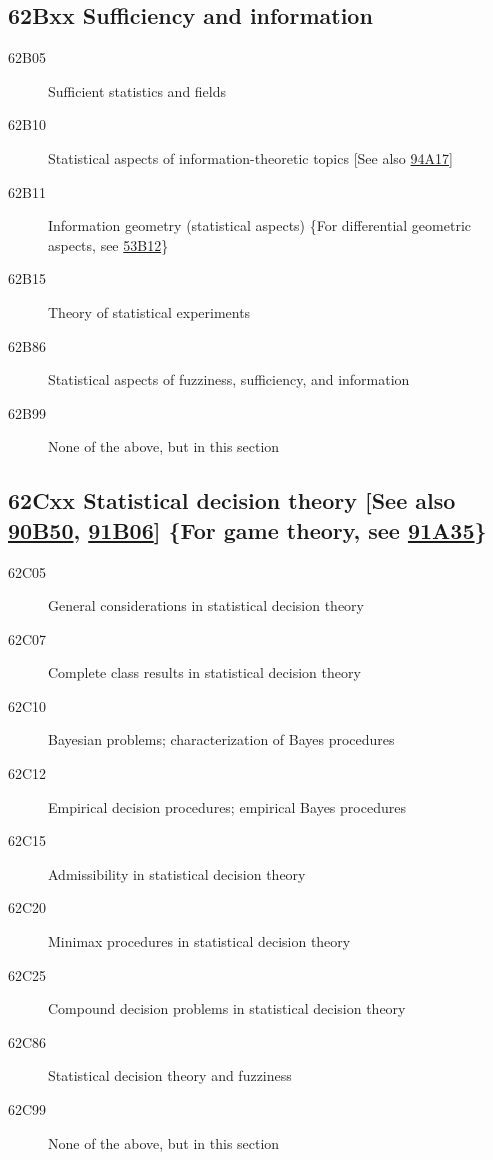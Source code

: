 \subsection*{62Bxx  Sufficiency and information }\label{62Bxx}
\begin{description}  
\item [62B05]\label{62B05} Sufficient statistics and fields
\item [62B10]\label{62B10} Statistical aspects of information-theoretic topics  [See also \hyperref[94A17]{94A17}]
\item [62B11]\label{62B11} Information geometry (statistical aspects) \{For differential geometric aspects, see \hyperref[53B12]{53B12}\}
\item [62B15]\label{62B15} Theory of statistical experiments
\item [62B86]\label{62B86} Statistical aspects of fuzziness, sufficiency, and information
\item [62B99]\label{62B99} None of the above, but in this section
\end{description}
\subsection*{62Cxx  Statistical decision theory [See also \hyperref[90B50]{90B50}, \hyperref[91B06]{91B06}] \{For game theory, see \hyperref[91A35]{91A35}\} }\label{62Cxx}
\begin{description}  
\item [62C05]\label{62C05} General considerations in statistical decision theory
\item [62C07]\label{62C07} Complete class results in statistical decision theory
\item [62C10]\label{62C10} Bayesian problems; characterization of Bayes procedures
\item [62C12]\label{62C12} Empirical decision procedures; empirical Bayes procedures
\item [62C15]\label{62C15} Admissibility in statistical decision theory
\item [62C20]\label{62C20} Minimax procedures in statistical decision theory
\item [62C25]\label{62C25} Compound decision problems in statistical decision theory
\item [62C86]\label{62C86} Statistical decision theory and fuzziness
\item [62C99]\label{62C99} None of the above, but in this section
\end{description}
